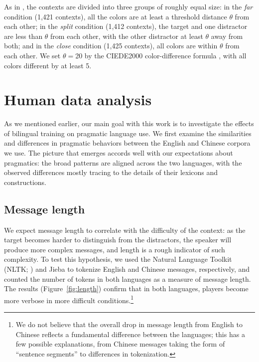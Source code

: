 \documentclass[11pt,a4paper]{article}
\renewcommand{\|}{\mid}
\newcommand{\figref}[1]{Figure~\ref{#1}}
\begin{document}
As in \citet{Monroe2017}, the contexts are divided into three groups of roughly equal size: in the \emph{far} condition (1,421 contexts), all the colors are at least a threshold distance $\theta$ from each other; in the \emph{split} condition (1,412 contexts), the target and one distractor are less than $\theta$ from each other, with the other distractor at least $\theta$ away from both; and in the \emph{close} condition (1,425 contexts), all colors are within $\theta$ from each other. We set $\theta = {}$20 by the CIEDE2000 color-difference formula \citep{Sharma2005}, with all colors different by at least 5.

\section{Human data analysis}

As we mentioned earlier, our main goal with this work is to investigate the effects of bilingual training on pragmatic language use. We first examine the similarities and differences in pragmatic behaviors between the English and Chinese corpora we use. The picture that emerges accords well with our expectations about pragmatics: the broad patterns are aligned across the two languages, with the observed differences mostly tracing to the details of their lexicons and constructions.

\subsection{Message length}

We expect message length to correlate with the difficulty of the context: as the target becomes harder to distinguish from the distractors, the speaker will produce more complex messages, and length is a rough indicator of such complexity. %
To test this hypothesis, we used the Natural Language Toolkit (NLTK; \citealt{NLTKbook}) and Jieba \citep{Jieba:2015} to tokenize English and Chinese messages, respectively, and counted the number of tokens in both languages as a measure of message length. The results (\figref{fig:length}) confirm that in both languages, players become more verbose in more difficult conditions.\footnote{We do not believe that the overall drop in message length from English to Chinese reflects a fundamental difference between the languages; this has a few possible explanations, from Chinese messages taking the form of ``sentence segments'' \citep{WangQin2010} to differences in tokenization.}
\end{document}
